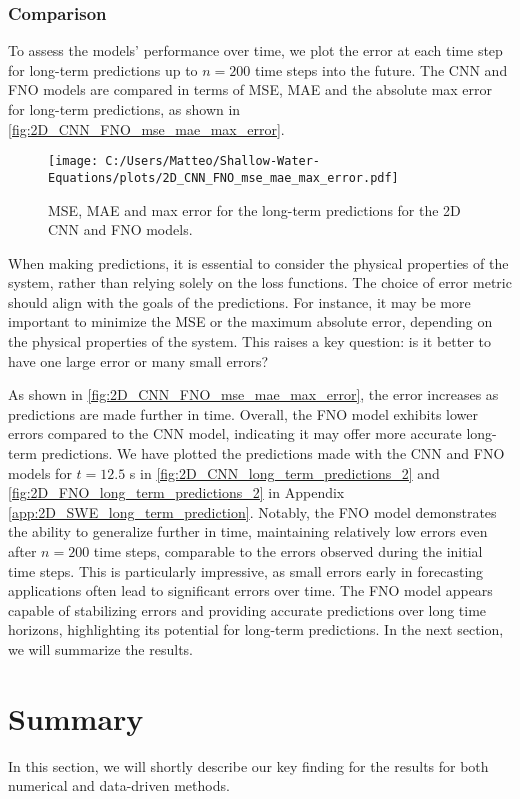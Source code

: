 \subsubsection*{Comparison}
To assess the models' performance over time, we plot the error at each time step for long-term predictions up to $n = 200$ time steps into the future.
The CNN and FNO models are compared in terms of MSE, MAE and the absolute max error for long-term predictions, as shown in \autoref{fig:2D_CNN_FNO_mse_mae_max_error}.
\begin{figure}[H]
    \centering
    \texttt{[image: C:/Users/Matteo/Shallow-Water-Equations/plots/2D\_CNN\_FNO\_mse\_mae\_max\_error.pdf]}
    \caption{MSE, MAE and max error for the long-term predictions for the 2D CNN and FNO models.}\label{fig:2D_CNN_FNO_mse_mae_max_error}
\end{figure}
When making predictions, it is essential to consider the physical properties of the system, rather than relying solely on the loss functions.
The choice of error metric should align with the goals of the predictions.
For instance, it may be more important to minimize the MSE or the maximum absolute error, depending on the physical properties of the system.
This raises a key question: is it better to have one large error or many small errors?

As shown in \autoref{fig:2D_CNN_FNO_mse_mae_max_error}, the error increases as predictions are made further in time.
Overall, the FNO model exhibits lower errors compared to the CNN model, indicating it may offer more accurate long-term predictions.
We have plotted the predictions made with the CNN and FNO models for $t = 12.5$ s in \autoref{fig:2D_CNN_long_term_predictions_2} and \autoref{fig:2D_FNO_long_term_predictions_2} in Appendix \autoref{app:2D_SWE_long_term_prediction}.
Notably, the FNO model demonstrates the ability to generalize further in time, maintaining relatively low errors even after $n = 200$ time steps, comparable to the errors observed during the initial time steps.
This is particularly impressive, as small errors early in forecasting applications often lead to significant errors over time.
The FNO model appears capable of stabilizing errors and providing accurate predictions over long time horizons, highlighting its potential for long-term predictions.
In the next section, we will summarize the results.

\newpage
\section{Summary}
In this section, we will shortly describe our key finding for the results for both numerical and data-driven methods.

